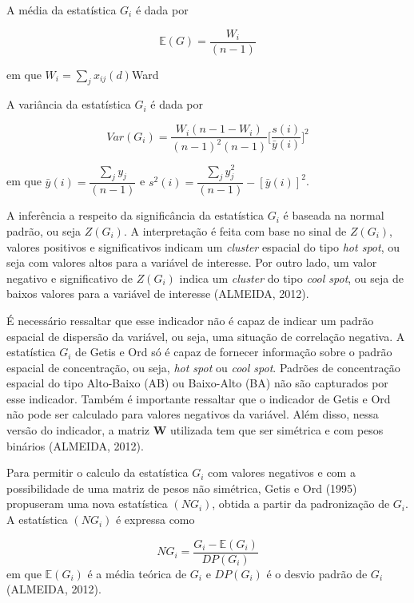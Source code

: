 \documentclass[12pt, a4paper,brazil,oneside]{article}
\begin{document}
	A média da estatística $G_i$ é dada por 
	
	\begin{equation*}
	\mathbb{E}(G) = \dfrac{W_i}{(n-1)}  
	\end{equation*}
	
	\noindent em que $W_i = \sum_j x_{ij}(d)$Ward
	
	A variância da estatística $G_i$ é dada por  
	
	\begin{equation}
	Var(G_i)= \dfrac{W_i(n-1-W_i)}{(n-1)^2(n-1)} \bigg[\dfrac{s(i)}{\bar{y}(i)}\bigg]^2
	\end{equation}
	
	\noindent em que $\bar{y}(i)= \dfrac{\sum_j y_j}{(n-1)}$ e $s^2(i) = \dfrac{\sum_j y_j^2}{(n-1)} - [\bar{y}(i)]^2$. 
	
	A inferência a respeito da significância da estatística $G_i$ é baseada na normal padrão, ou seja $Z(G_i)$. A interpretação é feita com base no sinal de $Z(G_i)$, valores positivos e significativos indicam um \textit{cluster} espacial do tipo \textit{hot spot}, ou seja com valores altos para a variável de interesse. Por outro lado, um valor negativo e significativo de $Z(G_i)$ indica um \textit{cluster} do tipo \textit{cool spot}, ou seja de baixos valores para a variável de interesse (ALMEIDA, 2012). 
	
	É necessário ressaltar que esse indicador não é capaz de indicar um padrão espacial de dispersão da variável, ou seja, uma situação de correlação negativa. A estatística $G_i$ de Getis e Ord só é capaz de fornecer informação sobre o padrão espacial de concentração, ou seja, \textit{hot spot} ou \textit{cool spot}. Padrões de concentração espacial do tipo Alto-Baixo (AB) ou Baixo-Alto (BA) não são capturados por esse indicador. Também é importante ressaltar que o indicador de Getis e Ord não pode ser calculado para valores negativos da variável.  Além disso, nessa versão do indicador, a matriz $\boldsymbol{W}$ utilizada  tem que ser simétrica e com pesos binários (ALMEIDA, 2012). 
	
	Para permitir o calculo da estatística $G_i$ com valores negativos e com a possibilidade de uma matriz de pesos não simétrica, Getis e Ord (1995) propuseram uma nova estatística $(NG_i)$, obtida a partir da padronização de $G_i$. A estatística $(NG_i)$ é expressa como 
	
	\begin{equation}
	NG_i = \dfrac{G_i-\mathbb{E}(G_i)}{DP(G_i)}
	\end{equation}
	\noindent em que $\mathbb{E}(G_i)$ é a média teórica de $G_i$ e $DP(G_i)$ é o desvio padrão de $G_i$ (ALMEIDA, 2012).
	
\end{document}
